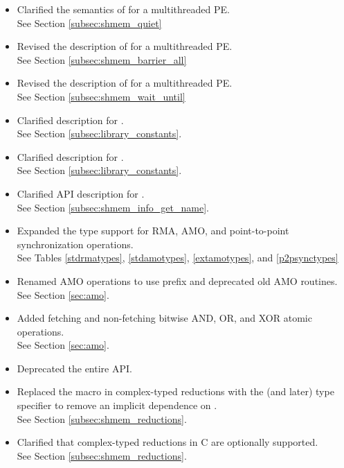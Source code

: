 \begin{itemize}
%
\item Clarified the semantics of  for a multithreaded
    \openshmem \ac{PE}.
\\See Section \ref{subsec:shmem_quiet}
%
\item Revised the description of  for a multithreaded
    \openshmem \ac{PE}.
\\See Section \ref{subsec:shmem_barrier_all}
%
\item Revised the description of  for a multithreaded
    \openshmem \ac{PE}.
\\See Section \ref{subsec:shmem_wait_until}
%
\item Clarified description for .
\\See Section \ref{subsec:library_constants}.
%
\item Clarified description for .
\\See Section \ref{subsec:library_constants}.
%
\item Clarified API description for .
\\See Section \ref{subsec:shmem_info_get_name}.
%
\item Expanded the type support for RMA, AMO, and point-to-point
    synchronization operations.
\\ See Tables \ref{stdrmatypes}, \ref{stdamotypes}, \ref{extamotypes}, and
    \ref{p2psynctypes}
%
\item Renamed AMO operations to use  prefix and
      deprecated old AMO routines.
\\ See Section \ref{sec:amo}.
%
\item Added fetching and non-fetching bitwise AND, OR, and XOR atomic
      operations.
\\ See Section \ref{sec:amo}.
%
\item Deprecated the entire \Fortran API.
%
\item Replaced the  macro in complex-typed reductions with the
      \Cstd[99] (and later) type specifier  to remove an
      implicit dependence on .
\\ See Section \ref{subsec:shmem_reductions}.
%
\item Clarified that complex-typed reductions in C are optionally supported.
\\ See Section \ref{subsec:shmem_reductions}.
%
\end{itemize}





